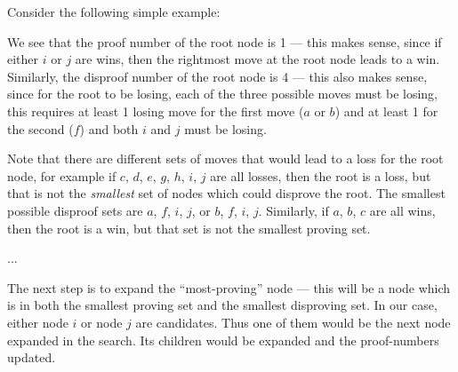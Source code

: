 \documentclass[10pt,dvipdfmx]{report}
\begin{document}
Consider the following simple example:
\iffalse
\begin{center}
\begin{tikzpicture}%
  \tikzstyle{level 1}=[level distance=20mm,sibling distance=50mm]
  \tikzstyle{level 2}=[level distance=20mm,sibling distance=20mm]
  \tikzstyle{level 3}=[level distance=20mm,sibling distance=10mm]
  \tikzstyle{boxn}=[rectangle,draw=red,inner sep=2]
  \tikzstyle{cirn}=[circle,draw=blue,inner sep=1]
  \node(0)[boxn]{$\frac14$}
    child{node[cirn]{$\frac31$}
      child{node[boxn]{$\frac11$} child{node{a}}}
      child{node[boxn]{$\frac11$} child{node{b}}}
      child{node[boxn]{$\frac13$} child{node{c}} child{node{d}} child{node{e}}}}
    child{node[cirn]{$\frac21$}
      child{node[boxn]{$\frac11$} child{node{f}}}
      child{node[boxn]{$\frac12$} child{node{g}} child{node{h}}}}
    child{node[cirn]{$\frac12$}
      child{node[boxn]{$\frac12$} child{node{i}} child{node{j}}}}
    ;
\end{tikzpicture}
\end{center}
\fi
We see that the proof number of the root node is 1 --- this makes sense, since if
either $i$ or $j$ are wins, then the rightmost move at the root node leads to a win.
Similarly, the disproof number of the root node is 4 --- this also makes sense, since
for the root to be losing, each of the three possible moves must be losing, this requires
at least 1 losing move for the first move ($a$ or $b$) and at least 1 for the second ($f$)
and both $i$ and $j$ must be losing.

Note that there are different sets of moves that would lead to a loss for the root node,
for example if $c$, $d$, $e$, $g$, $h$, $i$, $j$ are all losses, then the root is a loss, but that
is not the {\em smallest} set of nodes which could disprove the root.  The smallest possible disproof
sets are $a$, $f$, $i$, $j$, or $b$, $f$, $i$, $j$.
Similarly, if $a$, $b$, $c$ are all wins, then the root is a win, but that set is not the smallest
proving set.

...

The next step is to expand the ``most-proving'' node --- this will be a node which is in both the
smallest proving set and the smallest disproving set.  In our case, either node $i$ or node $j$ are
candidates.  Thus one of them would be the next node expanded in the search.  Its children would be
expanded and the proof-numbers updated.
\end{document}
